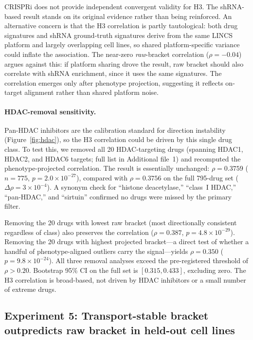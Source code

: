 \documentclass[11pt]{article}
\begin{document}
CRISPRi does not provide independent convergent validity for H3. The
shRNA-based result stands on its original evidence rather than being
reinforced. An alternative concern is that the H3 correlation is
partly tautological: both drug signatures and shRNA ground-truth
signatures derive from the same LINCS platform and largely overlapping
cell lines, so shared platform-specific variance could inflate the
association. The near-zero \emph{raw}-bracket correlation
($\rho = -0.04$) argues against this: if platform sharing drove the
result, raw bracket should also correlate with shRNA enrichment, since
it uses the same signatures. The correlation emerges only after
phenotype projection, suggesting it reflects on-target alignment
rather than shared platform noise.

\paragraph{HDAC-removal sensitivity.}
Pan-HDAC inhibitors are the calibration standard for direction instability
(Figure~\ref{fig:hdac}), so the H3 correlation could be driven by this
single drug class. To test this, we removed all 20 HDAC-targeting drugs
(spanning HDAC1, HDAC2, and HDAC6 targets; full list in Additional file~1)
and recomputed the phenotype-projected correlation. The result is
essentially unchanged: $\rho = 0.3759$ ($n = 775$,
$p = 2.0 \times 10^{-27}$), compared with $\rho = 0.3756$ on the full
795-drug set ($\Delta\rho = 3 \times 10^{-4}$). A synonym check for ``histone
deacetylase,'' ``class~I HDAC,'' ``pan-HDAC,'' and ``sirtuin'' confirmed
no drugs were missed by the primary filter.

Removing the 20 drugs with lowest raw bracket (most directionally
consistent regardless of class) also preserves the correlation
($\rho = 0.387$, $p = 4.8 \times 10^{-29}$). Removing the 20 drugs with
highest projected bracket---a direct test of whether a handful of
phenotype-aligned outliers carry the signal---yields $\rho = 0.350$
($p = 9.8 \times 10^{-24}$). All three removal analyses exceed the
pre-registered threshold of $\rho > 0.20$. Bootstrap 95\% CI on the full
set is $[0.315, 0.433]$, excluding zero. The H3 correlation is broad-based,
not driven by HDAC inhibitors or a small number of extreme drugs.

\subsection{Experiment 5: Transport-stable bracket outpredicts raw bracket in held-out cell lines}
\label{sec:exp5}
\end{document}
